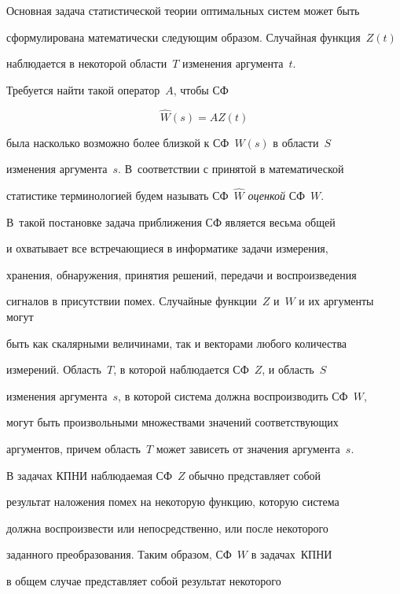 Основная задача  статистической теории оптимальных систем может быть


сформулирована математически следующим образом. Случайная функция~$Z(t)$


наблюдается в некоторой области~$T$ изменения аргумента~$t$.


Требуется найти такой оператор~$A$, чтобы СФ


    \begin{equation*}


    \hat W(s) = AZ(t)




    \end{equation*}


была насколько возможно более близкой к СФ~$W(s)$ в области~$S$


изменения аргумента~$s$. В~соответствии с принятой в математической


статистике терминологией будем называть СФ~$\hat W$ \textit{оценкой} СФ~$W$. 


В~такой постановке задача приближения СФ является весьма общей


и охватывает все встречающиеся в информатике задачи измерения,


хранения, обнаружения, принятия решений, передачи и воспроизведения


сигналов в присутствии помех. Случайные функции~$Z$ и~$W$ и их аргументы могут


быть как скалярными величинами, так и векторами любого количества


измерений. Область~$T$, в которой наблюдается СФ~$Z$, и область~$S$


изменения аргумента~$s$, в которой система должна воспроизводить СФ~$W$, 


могут быть произвольными множествами значений  соответствующих


аргументов, причем область~$T$ может зависеть от  значения аргумента~$s$.





В задачах КПНИ наблюдаемая СФ~$Z$ обычно представляет собой


результат наложения помех на некоторую функцию, которую система


должна воспроизвести или непосредственно, или после некоторого


заданного преобразования. Таким образом, СФ~$W$ в задачах~\mbox{КПНИ}


в общем случае представляет собой результат некоторого



